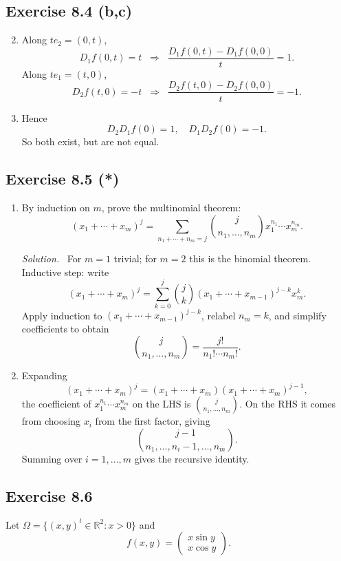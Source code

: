 \documentclass[11pt,a4paper]{article}
\newenvironment{solution}{\par\noindent\textit{Solution.}\ }{\par\vspace{0.5em}}
\begin{document}
\subsection*{Exercise 8.4 (b,c)}
\begin{enumerate}[label=\alph*)]
	\setcounter{enumi}{1}
	\item Along $te_2=(0,t)$,
	\[
	D_1 f(0,t)=t \;\;\Rightarrow\;\;\frac{D_1 f(0,t)-D_1 f(0,0)}{t}=1.
	\]
	Along $te_1=(t,0)$,
	\[
	D_2 f(t,0)=-t \;\;\Rightarrow\;\;\frac{D_2 f(t,0)-D_2 f(0,0)}{t}=-1.
	\]
	
	\item Hence
	\[
	D_2D_1 f(0)=1, \quad D_1D_2 f(0)=-1.
	\]
	So both exist, but are not equal.
\end{enumerate}


\subsection*{Exercise 8.5 (*)}
\begin{enumerate}[label=\alph*)]
	\item By induction on $m$, prove the multinomial theorem:
	\[
	(x_1+\cdots+x_m)^j = \sum_{n_1+\cdots+n_m=j}
	\binom{j}{n_1,\dots,n_m} x_1^{n_1}\cdots x_m^{n_m}.
	\]
	
	\begin{solution}
		For $m=1$ trivial; for $m=2$ this is the binomial theorem.  
		Inductive step: write
		\[
		(x_1+\cdots+x_m)^j = \sum_{k=0}^j \binom{j}{k}(x_1+\cdots+x_{m-1})^{j-k}x_m^k.
		\]
		Apply induction to $(x_1+\cdots+x_{m-1})^{j-k}$, relabel $n_m=k$, and simplify coefficients to obtain
		\[
		\binom{j}{n_1,\dots,n_m} = \frac{j!}{n_1!\cdots n_m!}.
		\]
	\end{solution}
	
	\item Expanding
	\[
	(x_1+\cdots+x_m)^j = (x_1+\cdots+x_m)(x_1+\cdots+x_m)^{j-1},
	\]
	the coefficient of $x_1^{n_1}\cdots x_m^{n_m}$ on the LHS is $\binom{j}{n_1,\dots,n_m}$.  
	On the RHS it comes from choosing $x_i$ from the first factor, giving
	\[
	\binom{j-1}{n_1,\dots,n_i-1,\dots,n_m}.
	\]
	Summing over $i=1,\dots,m$ gives the recursive identity.
\end{enumerate}


\subsection*{Exercise 8.6}
Let $\Omega=\{(x,y)^t\in\mathbb{R}^2:x>0\}$ and 
\[
f(x,y)=\begin{pmatrix}x\sin y\\ x\cos y\end{pmatrix}.
\]
\end{document}
